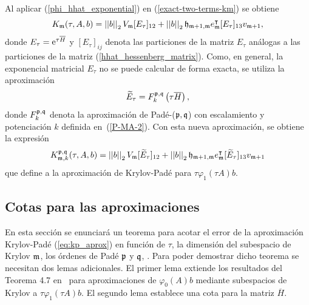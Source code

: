 Al aplicar (\ref{phi_hhat_exponential}) en (\ref{exact-two-terms-km}) se obtiene
\begin{equation*}
    K_{\mathfrak{m}}(\tau,A,b) = \left\lvert \left\lvert  b  \right\rvert \right\rvert_2V_{\mathfrak{m}} [E_\tau]_{12} + \left\lvert \left\lvert  b  \right\rvert \right\rvert_2\mathfrak{h}_{\mathfrak{m}+1,\mathfrak{m}}e^\intercal_{\mathfrak{m}}[E_\tau]_{13}v_{\mathfrak{m}+1},
 \end{equation*}
 donde $E_\tau = \mathrm{e}^{\tau \overline{H} }$ y $[E_\tau]_{ij}$ denota las particiones de la matriz $E_\tau$ análogas a las particiones de la matriz (\ref{hhat_hessenberg_matrix}). Como, en general, la exponencial matricial $E_\tau$ no se puede calcular de forma exacta, se utiliza la aproximación
\begin{equation*}
    \widetilde{E}_{\tau} = F_k^{\mathfrak{p},\mathfrak{q}}\left(\tau\overline{H}\right),
\end{equation*}
donde $F_k^{\mathfrak{p},\mathfrak{q}}$ denota la aproximación de Padé-($\mathfrak{p},\mathfrak{q}$) con escalamiento y potenciación $k$ definida en~(\ref{P-MA-2}). Con esta nueva aproximación, se obtiene la expresión
\begin{equation} \label{eq:kp_aprox}
    K_{\mathfrak{m},k}^{\mathfrak{p},\mathfrak{q}}(\tau,A,b) = \left\lvert \left\lvert  b  \right\rvert \right\rvert_2V_{\mathfrak{m}} [\widetilde{E}_\tau]_{12} + \left\lvert \left\lvert  b  \right\rvert \right\rvert_2\mathfrak{h}_{\mathfrak{m}+1,\mathfrak{m}}e^\intercal_{\mathfrak{m}}[\widetilde{E}_\tau]_{13}v_{\mathfrak{m}+1}
 \end{equation}
 que define a la aproximación de Krylov-Padé para $\tau\varphi_1(\tau A)b$.

 \subsection{Cotas para las aproximaciones}
 En esta sección se enunciará un teorema para acotar el error de la aproximación Krylov-Padé (\ref{eq:kp_aprox}) en función de $\tau$, la dimensión del subespacio de Krylov $\mathfrak{m}$, los órdenes de Padé $\mathfrak{p}$ y $\mathfrak{q}$, . Para poder demostrar dicho teorema se necesitan dos lemas adicionales. El primer lema extiende los resultados del Teorema 4.7 en~\cite{Saad92} para aproximaciones de $\varphi_0(A)b$ mediante subespacios de Krylov a $\tau \varphi_1(\tau A)b$. El segundo lema establece una cota para la matriz $\overline{H}$.

